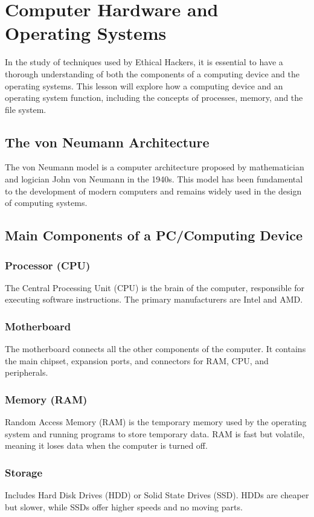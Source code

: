 \section{Computer Hardware and Operating Systems}

In the study of techniques used by Ethical Hackers, it is essential to have a thorough understanding of both the components of a computing device and the operating systems. This lesson will explore how a computing device and an operating system function, including the concepts of processes, memory, and the file system.

\subsection{The von Neumann Architecture}
The von Neumann model is a computer architecture proposed by mathematician and logician John von Neumann in the 1940s. This model has been fundamental to the development of modern computers and remains widely used in the design of computing systems.

\subsection{Main Components of a PC/Computing Device}
\subsubsection{Processor (CPU)}
The Central Processing Unit (CPU) is the brain of the computer, responsible for executing software instructions. The primary manufacturers are Intel and AMD.

\subsubsection{Motherboard}
The motherboard connects all the other components of the computer. It contains the main chipset, expansion ports, and connectors for RAM, CPU, and peripherals.

\subsubsection{Memory (RAM)}
Random Access Memory (RAM) is the temporary memory used by the operating system and running programs to store temporary data. RAM is fast but volatile, meaning it loses data when the computer is turned off.

\subsubsection{Storage}
Includes Hard Disk Drives (HDD) or Solid State Drives (SSD). HDDs are cheaper but slower, while SSDs offer higher speeds and no moving parts.

